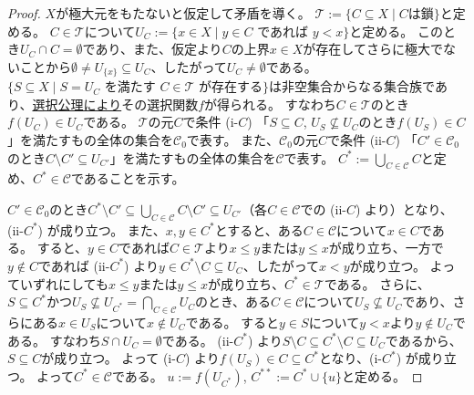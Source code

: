 ﻿\documentclass{ltjsarticle}
\theoremstyle{definition}
\begin{document}
\begin{proof}
    $X$が極大元をもたないと仮定して矛盾を導く。
    $\mathcal{T} := \{ C \subseteq X \mid \mbox{$C$は鎖} \}$と定める。
    $C \in \mathcal{T}$について$U_C := \{ x \in X \mid y \in C \mbox{ であれば } y < x \}$と定める。
    このとき$U_C \cap C = \emptyset$であり、また、仮定より$C$の上界$x \in X$が存在してさらに極大でないことから$\emptyset \neq U_{\{x\}} \subseteq U_C$、したがって$U_C \neq \emptyset$である。
    $\{ S \subseteq X \mid S = U_C \mbox{ を満たす } C \in \mathcal{T} \mbox{ が存在する} \}$は非空集合からなる集合族であり、\underline{選択公理により}その選択関数$f$が得られる。
    すなわち$C \in \mathcal{T}$のとき$f(U_C) \in U_C$である。
    $\mathcal{T}$の元$C$で条件 (i-$C$) 「$S \subseteq C$, $U_S \not\subseteq U_C$のとき$f(U_S) \in C$」を満たすもの全体の集合を$\mathcal{C}_0$で表す。
    また、$\mathcal{C}_0$の元$C$で条件 (ii-$C$) 「$C' \in \mathcal{C}_0$のとき$C \setminus C' \subseteq U_{C'}$」を満たすもの全体の集合を$\mathcal{C}$で表す。
    $C^* := \bigcup_{C \in \mathcal{C}} C$と定め、$C^* \in \mathcal{C}$であることを示す。

    $C' \in \mathcal{C}_0$のとき$C^* \setminus C' \subseteq \bigcup_{C \in \mathcal{C}} C \setminus C' \subseteq U_{C'}$（各$C \in \mathcal{C}$での (ii-$C$) より）となり、(ii-$C^*$) が成り立つ。
    また、$x,y \in C^*$とすると、ある$C \in \mathcal{C}$について$x \in C$である。
    すると、$y \in C$であれば$C \in \mathcal{T}$より$x \leq y$または$y \leq x$が成り立ち、一方で$y \not\in C$であれば (ii-$C^*$) より$y \in C^* \setminus C \subseteq U_C$、したがって$x < y$が成り立つ。
    よっていずれにしても$x \leq y$または$y \leq x$が成り立ち、$C^* \in \mathcal{T}$である。
    さらに、$S \subseteq C^*$かつ$U_S \not\subseteq U_{C^*} = \bigcap_{C \in \mathcal{C}} U_C$のとき、ある$C \in \mathcal{C}$について$U_S \not\subseteq U_C$であり、さらにある$x \in U_S$について$x \not\in U_C$である。
    すると$y \in S$について$y < x$より$y \not\in U_C$である。
    すなわち$S \cap U_C = \emptyset$である。
    (ii-$C^*$) より$S \setminus C \subseteq C^* \setminus C \subseteq U_C$であるから、$S \subseteq C$が成り立つ。
    よって (i-$C$) より$f(U_S) \in C \subseteq C^*$となり、(i-$C^*$) が成り立つ。
    よって$C^* \in \mathcal{C}$である。
    $u := f(U_{C^*})$, $C^{**} := C^* \cup \{u\}$と定める。


\end{proof}
\end{document}
